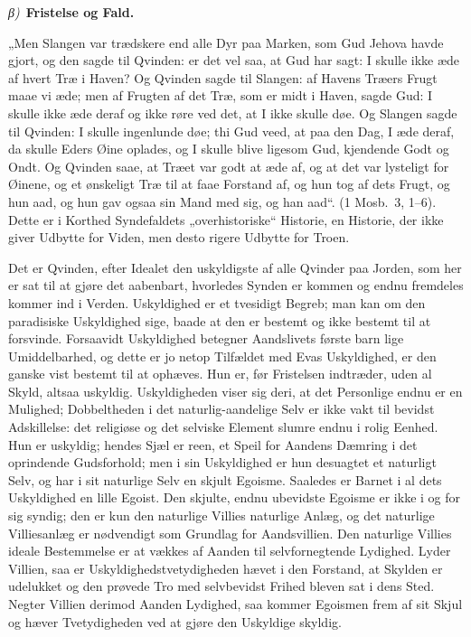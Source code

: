 \documentclass[12pt]{book}
\newcommand{\greekrun}[2]{%
  \medskip\begin{center}{\itshape #1)}\ {\bfseries #2}\end{center}\medskip}
\begin{document}
\greekrun{β}{Fristelse og Fald.}

„Men Slangen var trædskere end alle Dyr paa Marken, som Gud Jehova
havde gjort, og den sagde til Qvinden: er det vel saa, at Gud har
sagt: I skulle ikke æde af hvert Træ i Haven? Og Qvinden sagde til
Slangen: af Havens Træers Frugt maae vi æde; men af Frugten af det
Træ, som er midt i Haven, sagde Gud: I skulle ikke æde deraf og ikke
røre ved det, at I ikke skulle døe. Og Slangen sagde til Qvinden: I
skulle ingenlunde døe; thi Gud veed, at paa den Dag, I æde deraf, da
skulle Eders Øine oplades, og I skulle blive ligesom Gud, kjendende
Godt og Ondt. Og Qvinden saae, at Træet var godt at æde af, og at
det var lysteligt for Øinene, og et ønskeligt Træ til at faae
Forstand af, og hun tog af dets Frugt, og hun aad, og hun gav ogsaa
sin Mand med sig, og han aad“. (1 Mosb.\ 3, 1--6). Dette er i
Korthed Syndefaldets „overhistoriske“ Historie, en Historie, der
ikke giver Udbytte for Viden, men desto rigere Udbytte for Troen.

Det er Qvinden, efter Idealet den uskyldigste af alle Qvinder paa
Jorden, som her er sat til at gjøre det aabenbart, hvorledes Synden
er kommen og endnu fremdeles kommer ind i Verden. Uskyldighed er et
tvesidigt Begreb; man kan om den paradisiske Uskyldighed sige, baade
at den er bestemt og ikke bestemt til at forsvinde. Forsaavidt
Uskyldighed betegner Aandslivets første barn\-
lige Umiddelbarhed, og dette er jo netop Tilfældet med Evas
Uskyldighed, er den ganske vist bestemt til at ophæves. Hun er, før
Fristelsen indtræder, uden al Skyld, altsaa uskyldig. Uskyldigheden
viser sig deri, at det Personlige endnu er en Mulighed;
Dobbeltheden i det naturlig-aandelige Selv er ikke vakt til bevidst
Adskillelse: det religiøse og det selviske Element slumre endnu i
rolig Eenhed. Hun er uskyldig; hendes Sjæl er reen, et Speil for
Aandens Dæmring i det oprindende Gudsforhold; men i sin Uskyldighed
er hun desuagtet et naturligt Selv, og har i sit naturlige Selv en
skjult Egoisme. Saaledes er Barnet i al dets Uskyldighed en lille
Egoist. Den skjulte, endnu ubevidste Egoisme er ikke i og for sig
syndig; den er kun den naturlige Villies naturlige Anlæg, og det
naturlige Villiesanlæg er nødvendigt som Grundlag for Aandsvillien.
Den naturlige Villies ideale Bestemmelse er at vækkes af Aanden til
selvfornegtende Lydighed. Lyder Villien, saa er
Uskyldighedstvetydigheden hævet i den Forstand, at Skylden er
udelukket og den prøvede Tro med selvbevidst Frihed bleven sat i
dens Sted. Negter Villien derimod Aanden Lydighed, saa kommer
Egoismen frem af sit Skjul og hæver Tvetydigheden ved at gjøre den
Uskyldige skyldig.
\end{document}
